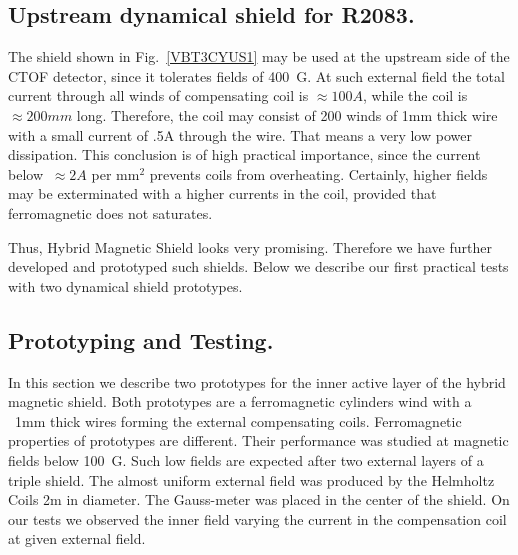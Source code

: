 \documentclass[12pt]{article}
\begin{document}
\subsection{Upstream dynamical shield for R2083.}
The  shield shown in Fig.~\ref{VBT3CYUS1}  may be used at the 
upstream side of the CTOF detector, since it tolerates fields of 400~G. 
 At such  external field the total current  through all winds of  compensating  coil 
is $\approx100A$, while  the coil is  $\approx200mm$ long.
Therefore,  the coil  may consist of  200 winds  of 1mm thick wire  with a small current of .5A through the wire. 
That  means a very low power dissipation.  This conclusion is of high  practical importance, since 
the  current   below  $~\approx 2A$ per mm$^2$ prevents coils from  overheating.
Certainly,  higher fields may be  exterminated with a higher currents in the  coil, 
provided that ferromagnetic does not saturates.

Thus, Hybrid Magnetic Shield looks  very promising. Therefore
we have  further  developed   and  prototyped  such shields.
Below we describe our first practical tests with  two dynamical shield prototypes.

\subsection{Prototyping and Testing.}
In this section  we describe two   prototypes for  the inner active layer of the hybrid
magnetic shield.  Both  prototypes are a ferromagnetic cylinders wind  
with a ~1mm thick wires forming the external  compensating coils.
Ferromagnetic properties of  prototypes are  different.  Their  performance was studied  
at  magnetic fields below 100~G.  Such low fields  are  
expected  after   two  external layers of  a triple  shield.
The almost uniform external field was produced by the Helmholtz Coils 2m in diameter. 
The Gauss-meter was placed in the center of the shield.  On our tests we observed the 
inner field  varying the current in the compensation coil at given  external field.
\end{document}
